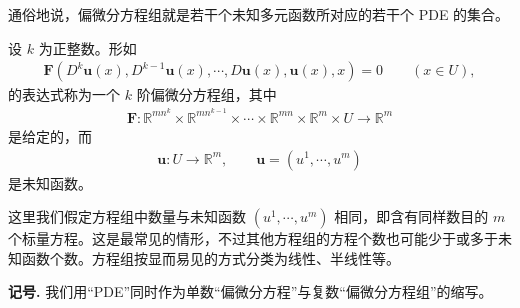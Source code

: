 \documentclass[../../main.tex]{subfiles}
\begin{document}
通俗地说，偏微分方程组就是若干个未知多元函数所对应的若干个 PDE 的集合。

\begin{definition}\label{definition:ch01-方程组}
设 $k$ 为正整数。形如
\begin{align}\label{align:ch01-system-general}
\mathbf{F}(D^k\mathbf{u}(x), D^{k-1}\mathbf{u}(x), \cdots, D\mathbf{u}(x), \mathbf{u}(x), x)=0 \qquad (x\in U),
\end{align}
的表达式称为一个 $k$ 阶偏微分方程组，其中
\begin{align*}
\mathbf{F}:\mathbb{R}^{mn^k}\times\mathbb{R}^{mn^{k-1}}\times\cdots\times\mathbb{R}^{mn}\times\mathbb{R}^m\times U\to\mathbb{R}^m
\end{align*}
是给定的，而
\begin{align*}
\mathbf{u}:U\to\mathbb{R}^m,\qquad \mathbf{u}=(u^1,\cdots,u^m)
\end{align*}
是未知函数。
\end{definition}

这里我们假定方程组中数量与未知函数 $(u^1,\cdots,u^m)$ 相同，即含有同样数目的 $m$ 个标量方程。这是最常见的情形，不过其他方程组的方程个数也可能少于或多于未知函数个数。方程组按显而易见的方式分类为线性、半线性等。

\textbf{记号.} 我们用``PDE''同时作为单数``偏微分方程''与复数``偏微分方程组''的缩写。
\end{document}
